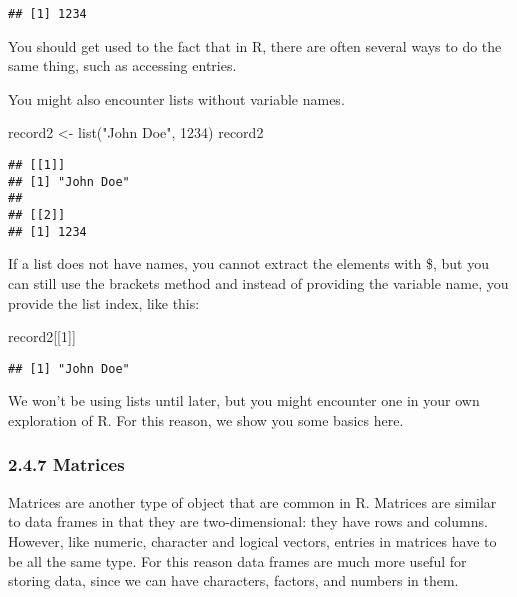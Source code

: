 \documentclass[
]{article}
\newenvironment{Shaded}{\begin{snugshade}}{\end{snugshade}}
\newcommand{\DecValTok}[1]{\textcolor[rgb]{0.00,0.00,0.81}{#1}}
\newcommand{\FunctionTok}[1]{\textcolor[rgb]{0.00,0.00,0.00}{#1}}
\newcommand{\NormalTok}[1]{#1}
\newcommand{\OtherTok}[1]{\textcolor[rgb]{0.56,0.35,0.01}{#1}}
\newcommand{\StringTok}[1]{\textcolor[rgb]{0.31,0.60,0.02}{#1}}
\begin{document}
\begin{verbatim}
## [1] 1234
\end{verbatim}

You should get used to the fact that in R, there are often several ways
to do the same thing, such as accessing entries.

You might also encounter lists without variable names.

\begin{Shaded}
\begin{Highlighting}[]
\NormalTok{record2 }\OtherTok{\textless{}{-}} \FunctionTok{list}\NormalTok{(}\StringTok{"John Doe"}\NormalTok{, }\DecValTok{1234}\NormalTok{)}
\NormalTok{record2}
\end{Highlighting}
\end{Shaded}

\begin{verbatim}
## [[1]]
## [1] "John Doe"
## 
## [[2]]
## [1] 1234
\end{verbatim}

If a list does not have names, you cannot extract the elements with \$,
but you can still use the brackets method and instead of providing the
variable name, you provide the list index, like this:

\begin{Shaded}
\begin{Highlighting}[]
\NormalTok{record2[[}\DecValTok{1}\NormalTok{]]}
\end{Highlighting}
\end{Shaded}

\begin{verbatim}
## [1] "John Doe"
\end{verbatim}

We won't be using lists until later, but you might encounter one in your
own exploration of R. For this reason, we show you some basics here.

\hypertarget{matrices}{%
\subsubsection{2.4.7 Matrices}\label{matrices}}

Matrices are another type of object that are common in R. Matrices are
similar to data frames in that they are two-dimensional: they have rows
and columns. However, like numeric, character and logical vectors,
entries in matrices have to be all the same type. For this reason data
frames are much more useful for storing data, since we can have
characters, factors, and numbers in them.
\end{document}
